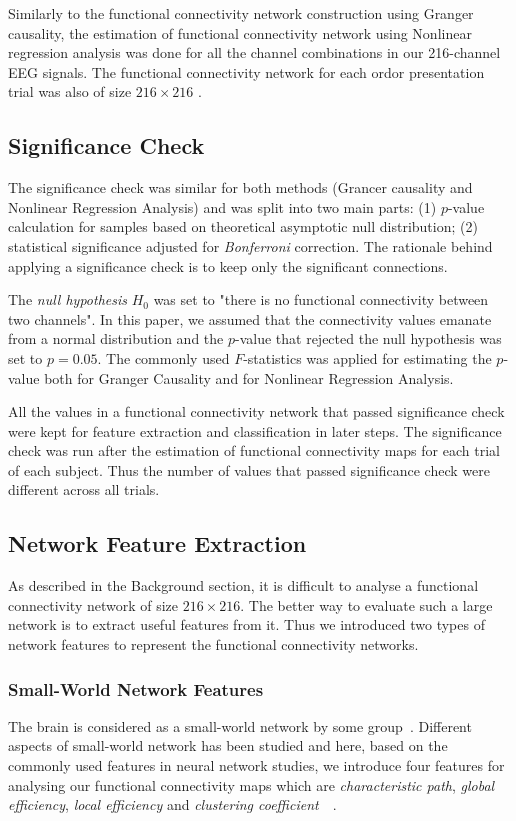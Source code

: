 Similarly to the functional connectivity network construction using Granger causality, the estimation of functional connectivity network using Nonlinear regression analysis was done for all the channel combinations in our 216-channel EEG signals. The functional connectivity network for each ordor presentation trial was also of size $216 \times 216$ .

\subsection{Significance Check}
The significance check was similar for both methods (Grancer causality and Nonlinear Regression Analysis) and was split into two main parts: (1) $p$-value calculation for samples based on theoretical asymptotic null distribution; (2) statistical significance adjusted for \emph{Bonferroni} correction. The rationale behind applying a significance check is to keep only the significant connections. 

The \emph{null hypothesis} $H_0$ was set to "there is no functional connectivity between two channels". In this paper, we assumed that the connectivity values emanate from a normal distribution and the $p$-value that rejected the null hypothesis was set to $p=0.05$. The commonly used $F$-statistics was applied for estimating the $p$-value both for Granger Causality and for Nonlinear Regression Analysis.

All the values in a functional connectivity network that passed significance check were kept for feature extraction and classification in later steps. The significance check was run after the estimation of functional connectivity maps for each trial of each subject. Thus the number of values that passed significance check were different across all trials. 


\subsection{Network Feature Extraction}
As described in the Background section, it is difficult to analyse a functional connectivity network of size $216 \times 216$. The better way to evaluate such a large network is to extract useful features from it. Thus we introduced two types of network features to represent the functional connectivity networks. 

\subsubsection{Small-World Network Features}
The brain is considered as a small-world network by some group~\cite{bassett2006small}. Different aspects of small-world network has been studied and here, based on the commonly used features in neural network studies, we introduce four features for analysing our functional connectivity maps which are \emph{characteristic path}, \emph{global efficiency}, \emph{local efficiency} and \emph{clustering coefficient}~\cite{watts1998collective}~\cite{latora2001efficient}.

